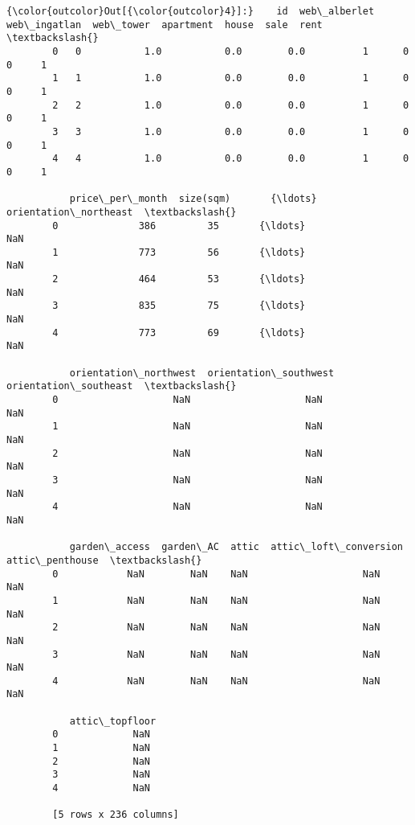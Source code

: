 \documentclass[11pt]{article}
\begin{document}
\begin{Verbatim}[commandchars=\\\{\}]
{\color{outcolor}Out[{\color{outcolor}4}]:}    id  web\_alberlet  web\_ingatlan  web\_tower  apartment  house  sale  rent  \textbackslash{}
        0   0           1.0           0.0        0.0          1      0     0     1   
        1   1           1.0           0.0        0.0          1      0     0     1   
        2   2           1.0           0.0        0.0          1      0     0     1   
        3   3           1.0           0.0        0.0          1      0     0     1   
        4   4           1.0           0.0        0.0          1      0     0     1   
        
           price\_per\_month  size(sqm)       {\ldots}        orientation\_northeast  \textbackslash{}
        0              386         35       {\ldots}                          NaN   
        1              773         56       {\ldots}                          NaN   
        2              464         53       {\ldots}                          NaN   
        3              835         75       {\ldots}                          NaN   
        4              773         69       {\ldots}                          NaN   
        
           orientation\_northwest  orientation\_southwest  orientation\_southeast  \textbackslash{}
        0                    NaN                    NaN                    NaN   
        1                    NaN                    NaN                    NaN   
        2                    NaN                    NaN                    NaN   
        3                    NaN                    NaN                    NaN   
        4                    NaN                    NaN                    NaN   
        
           garden\_access  garden\_AC  attic  attic\_loft\_conversion  attic\_penthouse  \textbackslash{}
        0            NaN        NaN    NaN                    NaN              NaN   
        1            NaN        NaN    NaN                    NaN              NaN   
        2            NaN        NaN    NaN                    NaN              NaN   
        3            NaN        NaN    NaN                    NaN              NaN   
        4            NaN        NaN    NaN                    NaN              NaN   
        
           attic\_topfloor  
        0             NaN  
        1             NaN  
        2             NaN  
        3             NaN  
        4             NaN  
        
        [5 rows x 236 columns]
\end{Verbatim}
            
\end{document}
